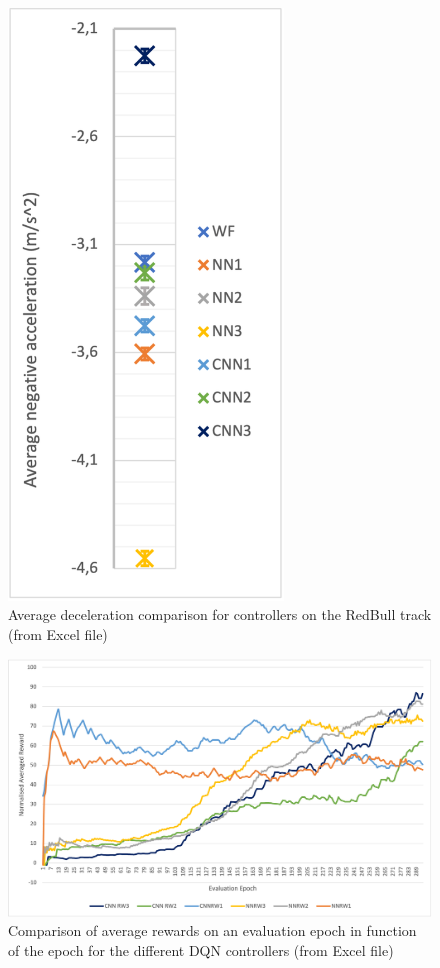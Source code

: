 \begin{figure}
\begin{minipage}{0.45\textwidth}
        \includegraphics[width=0.65\textwidth]{Figures/H1_decel.png}
        \caption{Average deceleration comparison for controllers on the RedBull track (from Excel file)}
        \label{h1_decel}
    \end{minipage}
\end{figure}

\begin{figure}
	\centering
	\includegraphics[scale=0.65]{Figures/eval_score.png}
	\caption{Comparison of average rewards on an evaluation epoch in function of the epoch for the different DQN controllers (from Excel file)}
	\label{comparison_eval}
\end{figure}

